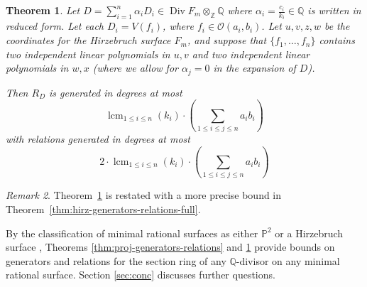 \documentclass{amsart}
\theoremstyle{plain}
\newtheorem{thm}{Theorem}[subsection]
\theoremstyle{definition}
\theoremstyle{remark}
\newtheorem{rem}[thm]{Remark}
\numberwithin{equation}{section}
\newcommand\bq{{\mathbb Q}}
\newcommand\bp{{\mathbb P}}
\newcommand\bz{{\mathbb Z}}
\newcommand\sco{{\mathscr O}}
\DeclareMathOperator\di{Div}
\newcommand\bida{a}
\newcommand\bidb{b}
\newcommand\hirz{F}
\DeclareMathOperator{\lcm}{lcm}
\begin{document}
\begin{thm}
\label{thm:hirz-generators-relations}
Let $D = \sum_{i = 1}^n \alpha_i D_i \in \di \hirz_m \otimes_\bz \bq$ where $\alpha_i = \frac{c_i}{k_i} \in \bq$ is written in reduced form.  
Let each $D_i = V(f_i)$, where $f_i \in \sco(a_i, b_i)$.
Let $u, v, z, w$ be the coordinates for the Hirzebruch surface
$\hirz_m$, and suppose that $\{f_1, \ldots, f_n\}$
contains two independent 
linear polynomials in $u, v$ and two independent linear polynomials in
$w, x$ {\rm(}where we allow for $\alpha_j = 0$ in the expansion of $D${\rm)}.

Then $R_D$ is generated in degrees at most
\[
	\lcm_{1\le i\le n}(k_i)\cdot \left(\sum_{1\le i\le j\le n} \bida_i \bidb_i\right) 
\]
\noindent
with relations generated in degrees at most 
\[
	2 \cdot \lcm_{1\le i\le n}(k_i) \cdot \left( \sum_{1\le i\le j\le n} \bida_i \bidb_i\right) 
\]
\end{thm}
\begin{rem}
Theorem~\ref{thm:hirz-generators-relations} is restated with a more precise
bound in Theorem~\ref{thm:hirz-generators-relations-full}.
\end{rem}

\noindent
By the classification of minimal rational surfaces
as either $\bp^2$ or a Hirzebruch surface \cite{eisenbud-harris:minimal},
Theorems \ref{thm:proj-generators-relations} and
\ref{thm:hirz-generators-relations} provide bounds on generators
and relations for the section ring of any $\bq$-divisor on any
minimal rational surface. Section \ref{sec:conc} discusses further questions.
\end{document}
